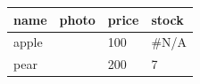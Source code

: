 \documentclass[11pt,a4paper]{article}
\begin{document}
\begin{table}[h]
\begin{tabular}{|l|l|l|l|}
\hline
name & photo & price & stock \\ \hline
apple & %
 & 100 & \#N/A \\ \hline
pear & %
 & 200 & 7 \\ \hline
\end{tabular}
\end{table}

\begin{table}[h]
\begin{tabular}{|l|}
\hline
 \\ \hline
\end{tabular}
\end{table}
\end{document}
